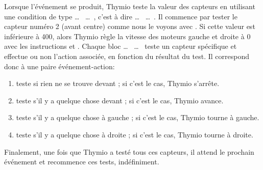 Lorsque l'événement se produit, Thymio teste la valeur des capteurs en utilisant une condition de type  \ldots \  \ldots \ , c'est à dire  \ldots \  \ldots \ .
Il commence par tester le capteur numéro 2 (avant centre) comme nous le voyons avec .
Si cette valeur est inférieure à 400, alors Thymio règle la vitesse des moteurs gauche et droite à 0 avec les instructions  et .
Chaque bloc  \ldots \  \ldots \  teste un capteur spécifique et effectue ou non l'action associée, en fonction du résultat du test.
Il correspond donc à une paire événement-action:
\begin{enumerate}[start=0]
	\item teste si rien ne se trouve devant ; si c'est le cas, Thymio s'arrête.
	\item teste s'il y a quelque chose devant ; si c'est le cas, Thymio avance.
	\item teste s'il y a quelque chose à gauche ; si c'est le cas, Thymio tourne à gauche.
	\item teste s'il y a quelque chose à droite ; si c'est le cas, Thymio tourne à droite.
\end{enumerate}
Finalement, une fois que Thymio a testé tous ces capteurs, il attend le prochain événement  et recommence ces tests, indéfiniment.

